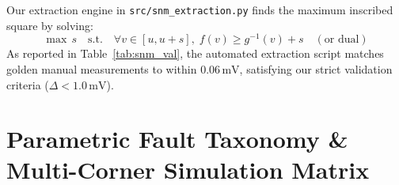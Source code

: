 \documentclass[conference]{IEEEtran}
\begin{document}
Our extraction engine in \texttt{src/snm\_extraction.py} finds the maximum inscribed square by solving:
\begin{equation}
\max \, s \quad \text{s.t.} \quad \forall v \in [u, u+s], \; f(v) \ge g^{-1}(v) + s \quad (\text{or dual})
\end{equation}
As reported in Table~\ref{tab:snm_val}, the automated extraction script matches golden manual measurements to within $0.06\,\text{mV}$, satisfying our strict validation criteria ($\Delta < 1.0\,\text{mV}$).

\begin{table}[t]
\centering
\caption{SNM Extraction Validation Against Golden Baselines}
\label{tab:snm_val}
\end{table}


\section{Parametric Fault Taxonomy \& Multi-Corner Simulation Matrix}
\label{sec:faults}
\end{document}
